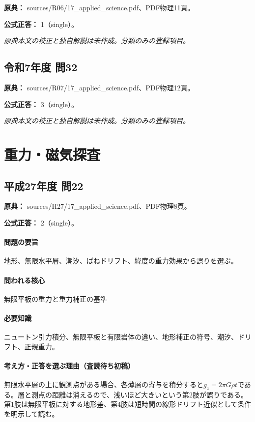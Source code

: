 \noindent\textbf{原典：} sources/R06/17\_applied\_science.pdf、PDF物理11頁。

\textbf{公式正答：} 1（single）。

\par\textit{原典本文の校正と独自解説は未作成。分類のみの登録項目。}

\subsection{令和7年度 問32}
\label{q:r07-reg-applied-32}

\noindent\textbf{原典：} sources/R07/17\_applied\_science.pdf、PDF物理12頁。

\textbf{公式正答：} 3（single）。

\par\textit{原典本文の校正と独自解説は未作成。分類のみの登録項目。}

\section{重力・磁気探査}

\subsection{平成27年度 問22}
\label{q:h27-reg-applied-22}

\noindent\textbf{原典：} sources/H27/17\_applied\_science.pdf、PDF物理8頁。

\textbf{公式正答：} 2（single）。

\paragraph{問題の要旨} 地形、無限水平層、潮汐、ばねドリフト、緯度の重力効果から誤りを選ぶ。

\paragraph{問われる核心} 無限平板の重力と重力補正の基準

\paragraph{必要知識} ニュートン引力積分、無限平板と有限岩体の違い、地形補正の符号、潮汐、ドリフト、正規重力。

\paragraph{考え方・正答を選ぶ理由（査読待ち初稿）} 無限水平層の上に観測点がある場合、各薄層の寄与を積分すると\(g_z=2\pi G\rho t\)である。層と測点の距離は消えるので、浅いほど大きいという第2肢が誤りである。第1肢は無限平板に対する地形差、第4肢は短時間の線形ドリフト近似として条件を明示して読む。


